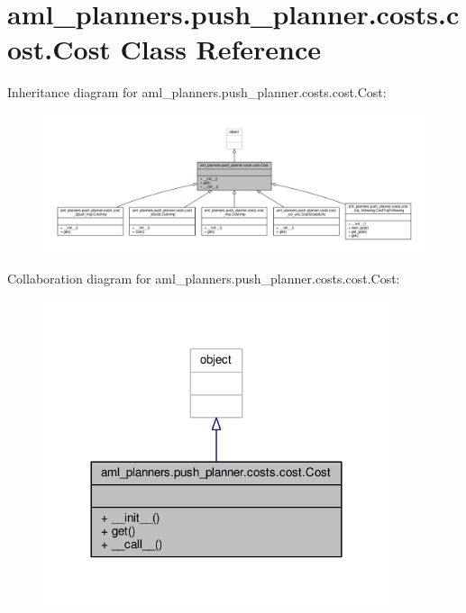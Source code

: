 \hypertarget{classaml__planners_1_1push__planner_1_1costs_1_1cost_1_1_cost}{\section{aml\-\_\-planners.\-push\-\_\-planner.\-costs.\-cost.\-Cost Class Reference}
\label{classaml__planners_1_1push__planner_1_1costs_1_1cost_1_1_cost}
}


Inheritance diagram for aml\-\_\-planners.\-push\-\_\-planner.\-costs.\-cost.\-Cost\-:
\nopagebreak
\begin{figure}[H]
\begin{center}
\leavevmode
\includegraphics[width=350pt]{classaml__planners_1_1push__planner_1_1costs_1_1cost_1_1_cost__inherit__graph}
\end{center}
\end{figure}


Collaboration diagram for aml\-\_\-planners.\-push\-\_\-planner.\-costs.\-cost.\-Cost\-:
\nopagebreak
\begin{figure}[H]
\begin{center}
\leavevmode
\includegraphics[width=288pt]{classaml__planners_1_1push__planner_1_1costs_1_1cost_1_1_cost__coll__graph}
\end{center}
\end{figure}
